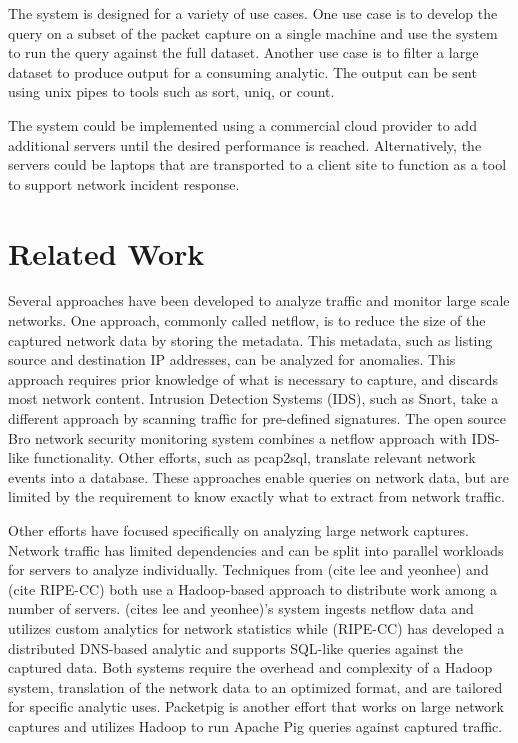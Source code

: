 \documentclass{article}
\begin{document}
\begin{multicols}{2}
The system is designed for a variety of use cases. One use case is to develop the query on a subset of the packet capture on a single machine and use the system to run the query against the full dataset.  Another use case is to filter a large dataset to produce output for a consuming analytic. The output can be sent using unix pipes to tools such as sort, uniq, or count. 

The system could be implemented using a commercial cloud provider to add additional servers until the desired performance is reached. Alternatively, the servers could be laptops that are transported to a client site to function as a tool to support network incident response.

\section*{Related Work}

Several approaches have been developed to analyze traffic and monitor large scale networks. One approach, commonly called netflow, is to reduce the size of the captured network data by storing the metadata. This metadata, such as listing source and destination IP addresses, can be analyzed for anomalies.  This approach requires prior knowledge of what is necessary to capture, and discards most network content. Intrusion Detection Systems (IDS), such as Snort, take a different approach by scanning traffic for pre-defined signatures. The open source Bro network security monitoring system combines a netflow approach with IDS-like functionality.  Other efforts, such as pcap2sql, translate relevant network events into a database. These approaches enable queries on network data, but are limited by the requirement to know exactly what to extract from network traffic. 

Other efforts have focused specifically on analyzing large network captures. Network traffic has limited dependencies and can be split into parallel workloads for servers to analyze individually.  Techniques from (cite lee and yeonhee) and (cite RIPE-CC) both use a Hadoop-based approach to distribute work among a number of servers.  (cites lee and yeonhee)'s system ingests netflow data and utilizes custom analytics for network statistics while (RIPE-CC) has developed a distributed DNS-based analytic and supports SQL-like queries against the captured data.  Both systems require the overhead and complexity of a Hadoop system, translation of the network data to an optimized format, and are tailored for specific analytic uses.  Packetpig is another effort that works on large network captures and utilizes Hadoop to run Apache Pig queries against captured traffic. 


\end{multicols}
\end{document}
